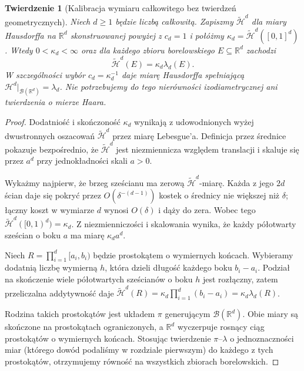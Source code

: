 \documentclass[11pt,a4paper,oneside]{book}
\numberwithin{equation}{chapter}
\theoremstyle{plain}
\newtheorem{twierdzenie}{Twierdzenie}[chapter]
\theoremstyle{definition}
\theoremstyle{remark}
\begin{document}
\begin{twierdzenie}[Kalibracja wymiaru całkowitego bez twierdzeń geometrycznych]
\label{thm:hausdorff-calibration-26}
Niech $d\ge1$ będzie liczbą całkowitą. Zapiszmy
$\widetilde{\mathcal H}^{d}$ dla miary Hausdorffa
na $\mathbb R^d$ skonstruowanej powyżej z $c_d=1$
i połóżmy $\kappa_d=\widetilde{\mathcal H}^{d}([0,1]^d)$.
Wtedy $0<\kappa_d<\infty$ oraz dla każdego
zbioru borelowskiego $E\subseteq\mathbb R^d$
zachodzi
\[
 \widetilde{\mathcal H}^{d}(E)=\kappa_d\lambda_d(E).
\]
W szczególności wybór $c_d=\kappa_d^{-1}$ daje
miarę Hausdorffa spełniającą
$\mathcal H^d|_{\mathcal B(\mathbb R^d)}=\lambda_d$.
Nie potrzebujemy do tego nierówności izodiametrycznej
ani twierdzenia o mierze Haara.
\end{twierdzenie}
\begin{proof}
Dodatniość i skończoność $\kappa_d$ wynikają z
udowodnionych wyżej dwustronnych oszacowań
$\widetilde{\mathcal H}^{d}$ przez miarę Lebesgue'a.
Definicja przez średnice pokazuje bezpośrednio,
że $\widetilde{\mathcal H}^{d}$ jest niezmiennicza
względem translacji i skaluje się przez $a^d$
przy jednokładności skali $a>0$.

Wykażmy najpierw, że brzeg sześcianu ma zerową
$\widetilde{\mathcal H}^{d}$-miarę.
Każda z jego $2d$ ścian daje się pokryć przez
$O(\delta^{-(d-1)})$ kostek o średnicy nie większej
niż $\delta$; łączny koszt w wymiarze $d$ wynosi
$O(\delta)$ i dąży do zera. Wobec tego
$\widetilde{\mathcal H}^{d}([0,1)^d)=\kappa_d$.
Z niezmienniczości i skalowania wynika, że każdy
półotwarty sześcian o boku $a$ ma miarę
$\kappa_da^d$.

Niech $R=\prod_{i=1}^d[a_i,b_i)$ będzie
prostokątem o wymiernych końcach.
Wybieramy dodatnią liczbę wymierną $h$, która
dzieli długość każdego boku $b_i-a_i$.
Podział na skończenie wiele półotwartych sześcianów
o boku $h$ jest rozłączny, zatem przeliczalna
addytywność daje
$\widetilde{\mathcal H}^{d}(R)
=\kappa_d\prod_{i=1}^d(b_i-a_i)
=\kappa_d\lambda_d(R)$.

Rodzina takich prostokątów jest układem $\pi$
generującym $\mathcal B(\mathbb R^d)$.
Obie miary są skończone na prostokątach ograniczonych,
a $\mathbb R^d$ wyczerpuje rosnący ciąg prostokątów
o wymiernych końcach. Stosując twierdzenie
$\pi$--$\lambda$ o jednoznaczności miar (którego
dowód podaliśmy w rozdziale pierwszym) do
każdego z tych prostokątów, otrzymujemy równość
na wszystkich zbiorach borelowskich.
\end{proof}
\end{document}
